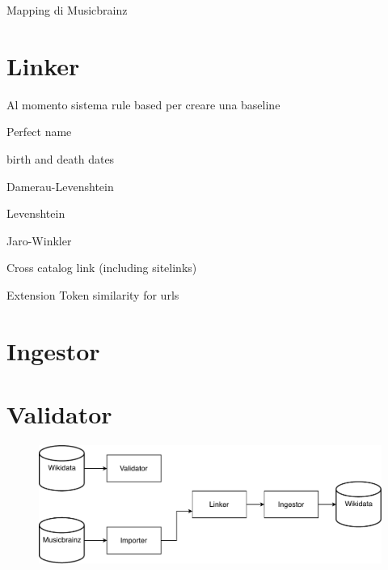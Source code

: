 Mapping di Musicbrainz


\section{Linker}
\label{cha:42}

Al momento sistema rule based per creare una baseline

Perfect name

birth and death dates

Damerau-Levenshtein

Levenshtein

Jaro-Winkler

Cross catalog link (including sitelinks)

Extension Token similarity for urls



\section{Ingestor}
\label{cha:43}

\section{Validator}
\label{cha:44}

\begin{figure}
  \begin{center}
   \includegraphics[width=\textwidth]{images/architecture.pdf}
  \end{center}
\end{figure}

